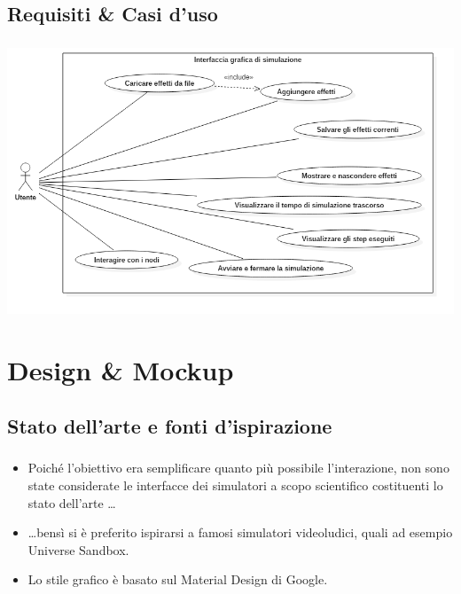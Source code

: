 \documentclass[%
]{beamer}
\begin{document}
        \subsection{Requisiti \& Casi d'uso}\label{subsec:requisiti}
            \begin{frame}
                \frametitle{\insertsection}
                \framesubtitle{\insertsubsection}
                \centering
                \includegraphics[scale=0.40]{uml/useCaseBeamer}
            \end{frame}

    \section{Design \& Mockup}\label{sec:mockup}
        \subsection{Stato dell'arte e fonti d'ispirazione}\label{subsec:sota}
            \begin{frame}
                \frametitle{\insertsection}
                \framesubtitle{\insertsubsection}

                \begin{itemize}[<+->]
                    \item
                        Poiché l'obiettivo era semplificare quanto più possibile l'interazione, non sono state considerate le interfacce dei simulatori a scopo scientifico costituenti lo stato dell'arte \ldots
                    \item
                        \ldots bensì si è preferito ispirarsi a famosi simulatori videoludici, quali ad esempio Universe Sandbox.
                    \item
                        Lo stile grafico è basato sul Material Design di Google.
                \end{itemize}
            \end{frame}
\end{document}
